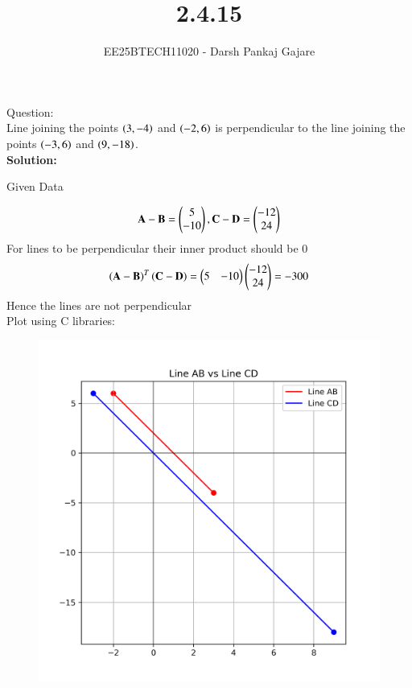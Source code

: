 \documentclass[journal,12pt,onecolumn]{IEEEtran}
\begin{document}
\title{2.4.15}
\author{EE25BTECH11020 - Darsh Pankaj Gajare}
{\let\newpage\relax\maketitle}
Question:\\
Line joining the points $\left(3,-4\right)$ and $\left(-2,6\right)$ is perpendicular to the line joining the points $\left(-3,6\right)$  and $\left(9,-18\right)$.\\
\textbf{Solution:}
\begin{table}[H]
	\centering
	\caption{Given Data}
	
	\label{}
\end{table}
\begin{align}
\mathbf{A}-\mathbf{B}=\begin{pmatrix}5\\-10\end{pmatrix}, \mathbf{C}-\mathbf{D}=\begin{pmatrix}-12\\24\end{pmatrix}
\end{align}
For lines to be perpendicular their inner product should be 0
\begin{align}
	\left(\mathbf{A}-\mathbf{B}\right)^T \left(\mathbf{C}-\mathbf{D}\right)=\begin{pmatrix}5 &-10\end{pmatrix}\begin{pmatrix}-12\\24\end{pmatrix}= -300
    \end{align}
Hence the lines are not perpendicular \\
Plot using C libraries:
\begin{figure}[H]
	\centering
	\includegraphics[scale=0.5]{cplot}
	\caption*{}
	\label{img1}
\end{figure}
\end{document}
